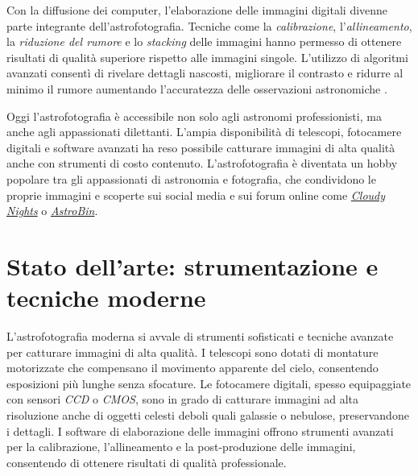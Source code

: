 Con la diffusione dei computer, l'elaborazione delle immagini digitali divenne parte integrante dell'astrofotografia. Tecniche come la \textit{calibrazione}, l'\textit{allineamento}, la \textit{riduzione del rumore} e lo \textit{stacking} delle immagini hanno permesso di ottenere risultati di qualità superiore rispetto alle immagini singole. L'utilizzo di algoritmi avanzati consentì di rivelare dettagli nascosti, migliorare il  contrasto e ridurre al minimo il rumore aumentando l'accuratezza delle osservazioni astronomiche \cite{calibration_1}\cite{calibration_2}.

Oggi l'astrofotografia è accessibile non solo agli astronomi professionisti, ma anche agli appassionati dilettanti. L'ampia disponibilità di telescopi, fotocamere digitali e software avanzati ha reso possibile catturare immagini di alta qualità anche con strumenti di costo contenuto. L'astrofotografia è diventata un hobby popolare tra gli appassionati di astronomia e fotografia, che condividono le proprie immagini e scoperte sui social media e sui forum online come \textit{\href{https://www.cloudynights.com/index}{Cloudy Nights}} o \textit{\href{https://www.astrobin.com}{AstroBin}}.

\section{Stato dell'arte: strumentazione e tecniche moderne} \label{state_of_the_art}

L'astrofotografia moderna si avvale di strumenti sofisticati e tecniche avanzate per catturare immagini di alta qualità. I telescopi sono dotati di montature motorizzate che compensano il movimento apparente del cielo, consentendo esposizioni più lunghe senza sfocature. Le fotocamere digitali, spesso equipaggiate con sensori \textit{CCD} o \textit{CMOS}, sono in grado di catturare immagini ad alta risoluzione anche di oggetti celesti deboli quali galassie o nebulose, preservandone i dettagli. I software di elaborazione delle immagini offrono strumenti avanzati per la calibrazione, l'allineamento e la post-produzione delle immagini, consentendo di ottenere risultati di qualità professionale.

